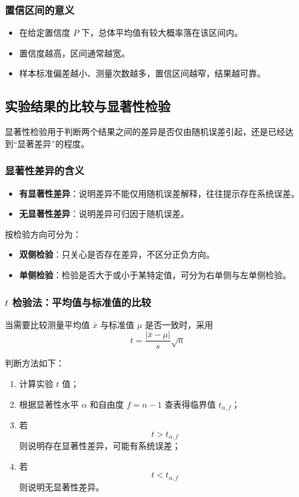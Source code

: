 \documentclass[12pt,a4paper]{article}
\numberwithin{equation}{section}
\begin{document}
\subsubsection{置信区间的意义}

\begin{itemize}
    \item 在给定置信度 $P$ 下，总体平均值有较大概率落在该区间内。
    \item 置信度越高，区间通常越宽。
    \item 样本标准偏差越小、测量次数越多，置信区间越窄，结果越可靠。
\end{itemize}

\subsection{实验结果的比较与显著性检验}

显著性检验用于判断两个结果之间的差异是否仅由随机误差引起，还是已经达到“显著差异”的程度。

\subsubsection{显著性差异的含义}

\begin{itemize}
    \item \textbf{有显著性差异}：说明差异不能仅用随机误差解释，往往提示存在系统误差。
    \item \textbf{无显著性差异}：说明差异可归因于随机误差。
\end{itemize}

按检验方向可分为：
\begin{itemize}
    \item \textbf{双侧检验}：只关心是否存在差异，不区分正负方向。
    \item \textbf{单侧检验}：检验是否大于或小于某特定值，可分为右单侧与左单侧检验。
\end{itemize}

\subsubsection{$t$ 检验法：平均值与标准值的比较}

当需要比较测量平均值 $\bar{x}$ 与标准值 $\mu$ 是否一致时，采用
\begin{equation}
t=\frac{|\bar{x}-\mu|}{s}\sqrt{n}
\end{equation}

判断方法如下：
\begin{enumerate}
    \item 计算实验 $t$ 值；
    \item 根据显著性水平 $\alpha$ 和自由度 $f=n-1$ 查表得临界值 $t_{\alpha,f}$；
    \item 若
\begin{equation}
    t>t_{\alpha,f}
\end{equation}
    则说明存在显著性差异，可能有系统误差；
    \item 若
\begin{equation}
    t<t_{\alpha,f}
\end{equation}
    则说明无显著性差异。
\end{enumerate}
\end{document}
